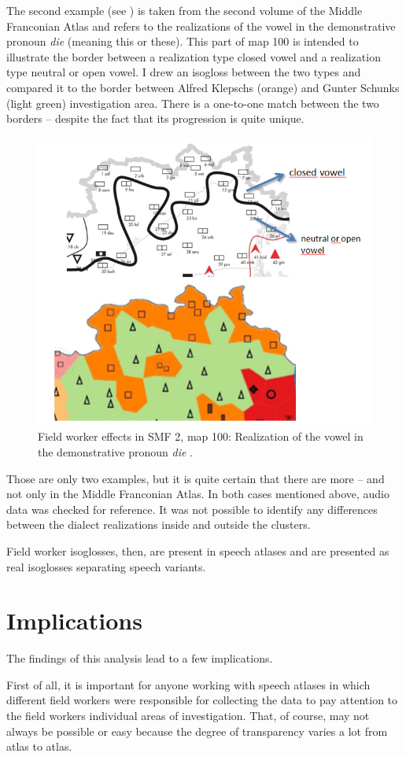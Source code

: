 \documentclass[output=paper]{LSP/langsci}
\begin{document}
The second example (see ) is taken from the second volume of the Middle Franconian Atlas and refers to the realizations of the vowel in the demonstrative pronoun \textit{die} (meaning {\textquotesingle}this{\textquotesingle} or {\textquotesingle}these{\textquotesingle}). This part of map 100 is intended to illustrate the border between a realization type {\textquotedbl}closed vowel{\textquotedbl} and a realization type {\textquotedbl}neutral or open vowel{\textquotedbl}. I drew an isogloss between the two types and compared it to the border between Alfred Klepsch{\textquotesingle}s (orange) and Gunter Schunk{\textquotesingle}s (light green) investigation area. There is a one-to-one match between the two borders – despite the fact that its progression is quite unique.

\begin{figure}
\includegraphics[width=.4\textwidth]{illustrations/mathus_fig12}
\caption{Field worker effects in SMF 2, map 100: Realization of the vowel in the demonstrative pronoun \textit{die} \citep[241]{mathussek_sprachraume_2014}.}
\label{fig:12}
\end{figure}

Those are only two examples, but it is quite certain that there are more – and not only in the Middle Franconian Atlas. In both cases mentioned above, audio data was checked for reference. It was not possible to identify any differences between the dialect realizations inside and outside the clusters.

Field worker isoglosses, then, are present in speech atlases and are presented as {\textquotedbl}real isoglosses{\textquotedbl} separating speech variants.

\section{Implications}
The findings of this analysis lead to a few implications.

First of all, it is important for anyone working with speech atlases in which different field workers were responsible for collecting the data to pay attention to the field workers{\textquotesingle} individual areas of investigation. That, of course, may not always be possible or easy because the degree of transparency varies a lot from atlas to atlas.
\end{document}
